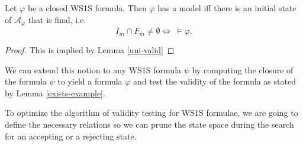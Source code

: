 \begin{lemma}\label{exists-example}
Let $\varphi$ be a closed WS1S formula. Then $\varphi$ has a model
iff there is an initial state of $\mathcal{A}_\varphi$ that is final, i.e.
\begin{equation}
 I_m \cap F_m \neq \emptyset \Leftrightarrow\ \models \varphi.
\end{equation}
\end{lemma}

\begin{proof}
This is implied by Lemma \ref{uni-valid}
\end{proof}

We can extend this notion to any WS1S formula $\psi$ by computing the
closure of the formula $\psi$ to yield a formula $\varphi$ and test the validity
of the formula as stated by Lemma \ref{exists-example}.

% 
% 

To optimize the algorithm of validity testing for WS1S formulae, we are going
to define the necessary relations so we can prune the state space during the
search for an accepting or a rejecting state. 

